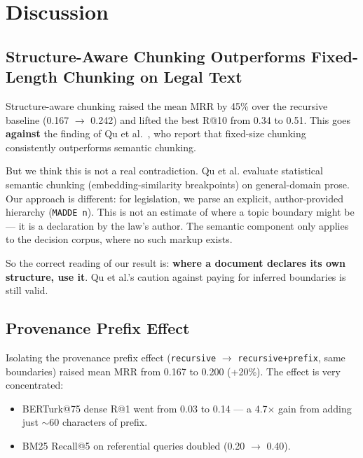 \documentclass[11pt,a4paper,twocolumn]{article}
\begin{document}
\section{Discussion}
\label{sec:discussion}

\subsection{Structure-Aware Chunking Outperforms Fixed-Length Chunking on Legal Text}

Structure-aware chunking raised the mean MRR by 45\% over the recursive baseline (0.167 $\rightarrow$ 0.242) and lifted the best R@10 from 0.34 to 0.51. This goes \textbf{against} the finding of Qu et al.~\cite{qu2025}, who report that fixed-size chunking consistently outperforms semantic chunking.

But we think this is not a real contradiction. Qu et al. evaluate statistical semantic chunking (embedding-similarity breakpoints) on general-domain prose. Our approach is different: for legislation, we parse an explicit, author-provided hierarchy (\texttt{MADDE n}). This is not an estimate of where a topic boundary might be --- it is a declaration by the law's author. The semantic component only applies to the decision corpus, where no such markup exists.

So the correct reading of our result is: \textbf{where a document declares its own structure, use it}. Qu et al.'s caution against paying for inferred boundaries is still valid.

\subsection{Provenance Prefix Effect}

Isolating the provenance prefix effect (\texttt{recursive} $\rightarrow$ \texttt{recursive+prefix}, same boundaries) raised mean MRR from 0.167 to 0.200 (+20\%). The effect is very concentrated:

\begin{itemize}[leftmargin=*]
  \item BERTurk@75 dense R@1 went from 0.03 to 0.14 --- a 4.7$\times$ gain from adding just ${\sim}$60 characters of prefix.
  \item BM25 Recall@5 on referential queries doubled (0.20 $\rightarrow$ 0.40).
\end{itemize}
\end{document}
